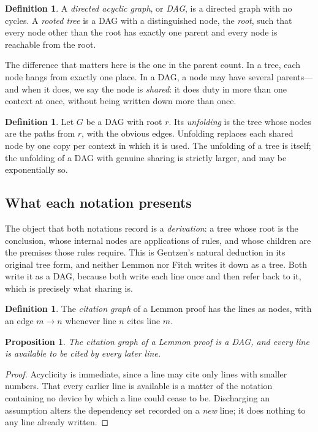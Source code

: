 \documentclass[11pt]{article}
\theoremstyle{plain}
\newtheorem{proposition}[theorem]{Proposition}
\theoremstyle{definition}
\newtheorem{definition}[theorem]{Definition}
\theoremstyle{remark}
\begin{document}
\begin{definition}
A \emph{directed acyclic graph}, or \emph{DAG}, is a directed graph with no
cycles. A \emph{rooted tree} is a DAG with a distinguished node, the
\emph{root}, such that every node other than the root has exactly one parent
and every node is reachable from the root.
\end{definition}

The difference that matters here is the one in the parent count. In a tree,
each node hangs from exactly one place. In a DAG, a node may have several
parents---and when it does, we say the node is \emph{shared}: it does duty in
more than one context at once, without being written down more than once.

\begin{definition}
Let $G$ be a DAG with root $r$. Its \emph{unfolding} is the tree whose nodes
are the paths from $r$, with the obvious edges. Unfolding replaces each shared
node by one copy per context in which it is used. The unfolding of a tree is
itself; the unfolding of a DAG with genuine sharing is strictly larger, and
may be exponentially so.
\end{definition}

\subsection{What each notation presents}

The object that both notations record is a \emph{derivation}: a tree whose
root is the conclusion, whose internal nodes are applications of rules, and
whose children are the premises those rules require. This is Gentzen's
natural deduction in its original tree form, and neither Lemmon nor Fitch
writes it down as a tree. Both write it as a DAG, because both write each line
once and then refer back to it, which is precisely what sharing is.

\begin{definition}
The \emph{citation graph} of a Lemmon proof has the lines as nodes, with an
edge $m \to n$ whenever line $n$ cites line $m$.
\end{definition}

\begin{proposition}\label{prop:lemmondag}
The citation graph of a Lemmon proof is a DAG, and every line is available to
be cited by every later line.
\end{proposition}

\begin{proof}
Acyclicity is immediate, since a line may cite only lines with smaller
numbers. That every earlier line is available is a matter of the notation
containing no device by which a line could cease to be. Discharging an
assumption alters the dependency set recorded on a \emph{new} line; it does
nothing to any line already written.
\end{proof}
\end{document}
